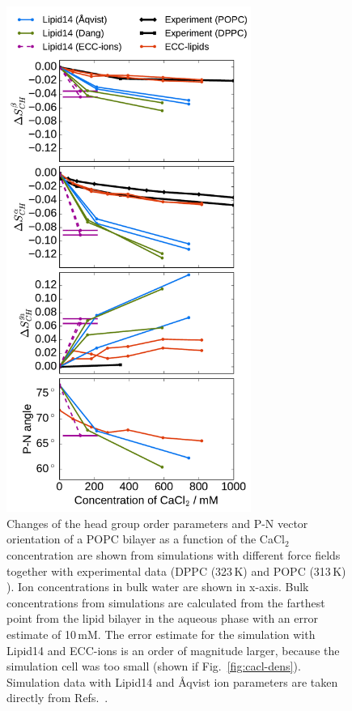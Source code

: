 \documentclass[aip,jcp,twocolumn]{revtex4}
\begin{document}
\begin{figure}[htb!]
  \centering
  \includegraphics[width=8.0cm]{../Fig/ipython_nb/PN_angle_OrdPars-A-B-g3_L14-ECCL17_q80_sig89_CaCl.pdf}
  \caption{\label{fig:delta_ordPar_CaCl}
    Changes of the head group order parameters and P-N vector orientation of a POPC bilayer 
    as a function of the CaCl$_2$ concentration
    are shown from simulations with different force fields together with experimental data 
    (DPPC (323\,K) \cite{akutsu81} and POPC (313\,K) \cite{altenbach84}). 
    Ion concentrations in bulk water are shown in x-axis. 
    Bulk concentrations from simulations are calculated 
    from the farthest point from the lipid bilayer in the aqueous phase
    with an error estimate of 10\,mM.
    The error estimate for the simulation with Lipid14 and ECC-ions is an order of magnitude larger, 
    because the simulation cell was too small (shown if Fig.~\ref{fig:cacl-dens}). 
    Simulation data with Lipid14 and \AA{}qvist ion parameters are taken directly from
    Refs.~\cite{lipid14POPC0mMNaClfiles,lipid14POPC350mMCaClfiles,lipid14POPC350mMCaClfilesNC}.
  }
\end{figure}
\end{document}
